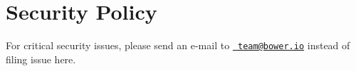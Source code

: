 \chapter{Security Policy}
\hypertarget{md__c_1_2_users_2_s_t_r_i_d_e_r_2source_2repos_2_ainslie_a_p_i_2wwwroot_2lib_2jquery-ui_2node__modules_2bower_2_s_e_c_u_r_i_t_y}{}\label{md__c_1_2_users_2_s_t_r_i_d_e_r_2source_2repos_2_ainslie_a_p_i_2wwwroot_2lib_2jquery-ui_2node__modules_2bower_2_s_e_c_u_r_i_t_y}
\label{md__c_1_2_users_2_s_t_r_i_d_e_r_2source_2repos_2_ainslie_a_p_i_2wwwroot_2lib_2jquery-ui_2node__modules_2bower_2_s_e_c_u_r_i_t_y_autotoc_md5368}%
%
 For critical security issues, please send an e-\/mail to \href{mailto:team@bower.io}{\texttt{ team@bower.\+io}} instead of filing issue here. 